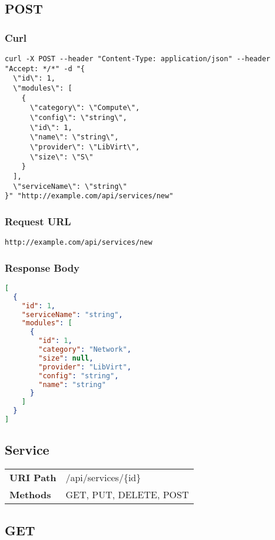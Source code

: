 \subsection{POST}
\subsubsection{Curl}
\begin{lstlisting}[style=Bash] 
curl -X POST --header "Content-Type: application/json" --header "Accept: */*" -d "{
  \"id\": 1,
  \"modules\": [
    {
      \"category\": \"Compute\",
      \"config\": \"string\",
      \"id\": 1,
      \"name\": \"string\",
      \"provider\": \"LibVirt\",
      \"size\": \"S\"
    }
  ],
  \"serviceName\": \"string\"
}" "http://example.com/api/services/new"
\end{lstlisting}

\subsubsection{Request URL}
\begin{lstlisting}[] 
http://example.com/api/services/new
\end{lstlisting}

\subsubsection{Response Body}
\begin{lstlisting}[language=json] 
[
  {
    "id": 1,
    "serviceName": "string",
    "modules": [
      {
        "id": 1,
        "category": "Network",
        "size": null,
        "provider": "LibVirt",
        "config": "string",
        "name": "string"
      }
    ]
  }
]
\end{lstlisting}





\subsection{Service}
\begin{tabularx}{\linewidth}{l l}
\textbf{URI Path} & /api/services/\{id\}\\
\textbf{Methods} & GET, PUT, DELETE, POST\\
\end{tabularx}

\subsection{GET}
